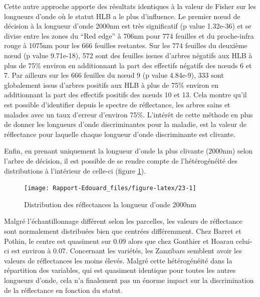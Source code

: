\documentclass[
  11pt,
  french,
  a4paper,
  extrafontsizes,onecolumn,openright
  ]{memoir}
\begin{document}
Cette autre approche apporte des résultats identiques à la valeur de Fisher sur les longueurs d'onde où le statut HLB a le plus d'influence. Le premier nœud de décision à la longueur d'onde 2000nm est très significatif (p value 1.32e-36) et se divise entre les zones du ``Red edge'' à 706nm pour 774 feuilles et du proche-infra rouge à 1075nm pour les 666 feuilles restantes. Sur les 774 feuilles du deuxième nœud (p value 9.71e-18), 572 sont des feuilles issues d'arbres négatifs aux HLB à plus de 75\% environ en additionnant la part des effectifs négatifs des nœuds 6 et 7. Par ailleurs sur les 666 feuilles du nœud 9 (p value 4.84e-9), 333 sont globalement issus d'arbres positifs aux HLB à plus de 75\% environ en additionnant la part des effectifs positifs des nœuds 10 et 13. Cela montre qu'il est possible d'identifier depuis le spectre de réflectance, les arbres sains et malades avec un taux d'erreur d'environ 75\%.
L'intérêt de cette méthode en plus de donner les longueurs d'onde discriminantes pour la maladie, est la valeur de réflectance pour laquelle chaque longueur d'onde discriminante est clivante.

Enfin, en prenant uniquement la longueur d'onde la plus clivante (2000nm) selon l'arbre de décision, il est possible de se rendre compte de l'hétérogénéité des distributions à l'intérieur de celle-ci (figure \ref{fig:23}).

\scriptsize

\begin{figure}

{\centering \texttt{[image: Rapport-Edouard\_files/figure-latex/23-1]} 

}

\caption{Distribution des réflectances la longueur d’onde 2000nm}\label{fig:23}
\end{figure}

\normalsize

\vfill
\newpage

Malgré l'échantillonnage différent selon les parcelles, les valeurs de réflectance sont normalement distribuées bien que centrées différemment. Chez Barret et Pothin, le centre est quasiment sur 0.09 alors que chez Gonthier et Hoarau celui-ci est environ à 0.07. Concernant les variétés, les Zanzibars semblent avoir les valeurs de réflectances les moins élevés. Malgré cette hétérogénéité dans la répartition des variables, qui est quasiment identique pour toutes les autres longueurs d'onde, cela n'a finalement pas un énorme impact sur la discrimination de la réflectance en fonction du statut.
\end{document}
